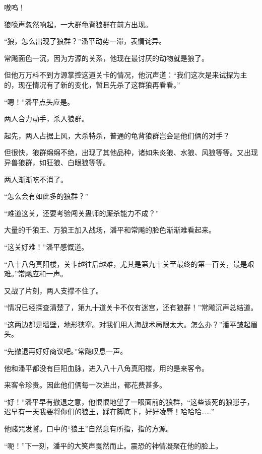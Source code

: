 
\begin{this_body}



嗷呜！

狼嚎声忽然响起，一大群龟背狼群在前方出现。

“狼，怎么出现了狼群？”潘平动势一滞，表情诧异。

常飚面色一沉，因为方源的关系，他现在最讨厌的动物就是狼了。

但他万万料不到方源掌控这道关卡的情况，他沉声道：“我们这次是来试探为主的，现在情况有了新的变化，暂且先杀了这群狼再看看。”

“嗯！”潘平点头应是。

两人合力动手，杀入狼群。

起先，两人占据上风，大杀特杀，普通的龟背狼群岂会是他们俩的对手？

但很快，狼群绵绵不绝，出现了其他品种，诸如朱炎狼、水狼、风狼等等。又出现异兽狼群，如狂狼、白眼狼等等。

两人渐渐吃不消了。

“怎么会有如此多的狼群？”

“难道这关，还要考验闯关蛊师的厮杀能力不成？”

大量的千狼王、万狼王加入战场，潘平和常飚的脸色渐渐难看起来。

“这关好难！”潘平感慨道。

“八十八角真阳楼，关卡越往后越难，尤其是第九十关至最终的第一百关，最是艰难。”常飚应和一声。

又战了片刻，两人支撑不住了。

“情况已经探查清楚了，第九十道关卡不仅有迷宫，还有狼群！”常飚沉声总结道。

“这两边都是墙壁，地形狭窄。对我们用人海战术局限太大。怎么办？”潘平皱起眉头。

“先撤退再好好商议吧。”常飚叹息一声。

他和潘平都没有巨阳血脉，进入八十八角真阳楼，用的是来客令。

来客令珍贵。因此他们俩每一次进出，都花费甚多。

“好！”潘平早有撤退之意，他恨恨地望了一眼面前的狼群，“这些该死的狼崽子，迟早有一天我要将你们的狼王，踩在脚底下，好好凌辱！哈哈哈……”

他赌咒发誓。口中的“狼王”自然意有所指，指的方源。

“呃！”下一刻，潘平的大笑声戛然而止。震恐的神情凝聚在他的脸上。


\end{this_body}
